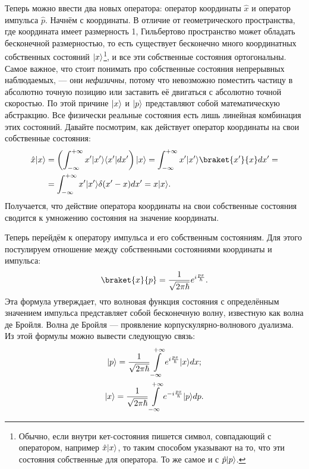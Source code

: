 Теперь можно ввести два новых оператора: оператор координаты $\hat{x}$ и
оператор импульса $\hat{p}$. Начнём с координаты. В отличие от геометрического
пространства, где координата имеет размерность 1, Гильбертово пространство
может обладать бесконечной размерностью, то есть существует бесконечно много
координатных собственных состояний $\lvert x\rangle$\footnote[1]{Обычно, если внутри
  кет-состояния пишется символ, совпадающий с оператором, например
  $\hat{x}\lvert x\rangle$, то таким способом указывают на то, что эти состояния
  собственные для оператора. То же самое и с $\hat{p}\lvert p\rangle$.}, и все эти
собственные состояния ортогональны. Самое важное, что стоит понимать про
собственные состояния непрерывных наблюдаемых, --- они \textit{нефизичны},
потому что невозможно поместить частицу в абсолютно точную позицию или
заставить её двигаться с абсолютно точной скоростью. По этой причине $\lvert x\rangle$
и $\lvert p\rangle$ представляют собой математическую абстракцию. Все физически
реальные состояния есть лишь линейная комбинация этих состояний. Давайте
посмотрим, как действует оператор координаты на свои собственные состояния:
\begin{align*}
  \hat{x} \ket{x} &= \left( \int_{-\infty}^{+\infty} x' \ket{x'} \bra{x'}dx' \right)
  \ket{x} = \int_{-\infty}^{+\infty} x' \ket{x'} \braket{x'}{x} dx' = \\
  &= \int_{-\infty}^{+\infty} x' \ket{x'} \delta(x'-x) dx' = x \ket{x}.
\end{align*}
Получается, что действие оператора координаты на свои собственные состояния
сводится к умножению состояния на значение координаты.

Теперь перейдём к оператору импульса и его собственным состояниям. Для этого
постулируем отношение между собственными состояниями координаты и импульса:
\[
  \braket{x}{p} = \frac{1}{\sqrt{2 \pi \hbar}}e^{i \frac{px}{\hbar}}.
\]
Эта формула утверждает, что волновая функция состояния с определённым значением
импульса представляет собой бесконечную волну, известную как волна де Бройля.
Волна де Бройля --- проявление корпускулярно-волнового дуализма. Из этой
формулы можно вывести следующую связь:
\begin{gather*}
  \lvert p\rangle = \frac{1}{\sqrt{2 \pi \hbar}}\int\limits_{-\infty}^{+\infty}
  e^{i \frac{px}{\hbar}} \lvert x\rangle dx; \\
  \lvert x\rangle = \frac{1}{\sqrt{2\pi\hbar}} \int\limits_{-\infty}^{+\infty}
  e^{-i \frac{px}{\hbar}} \lvert p\rangle dp.
\end{gather*}

